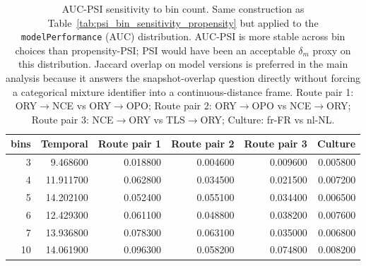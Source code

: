 \begin{table}
\caption{AUC-PSI sensitivity to bin count. Same construction as Table~\ref{tab:psi_bin_sensitivity_propensity} but applied to the \texttt{modelPerformance} (AUC) distribution. AUC-PSI is more stable across bin choices than propensity-PSI; PSI would have been an acceptable $\delta_m$ proxy on this distribution. Jaccard overlap on model versions is preferred in the main analysis because it answers the snapshot-overlap question directly without forcing a categorical mixture identifier into a continuous-distance frame. Route pair 1: ORY$\to$NCE vs ORY$\to$OPO; Route pair 2: ORY$\to$OPO vs NCE$\to$ORY; Route pair 3: NCE$\to$ORY vs TLS$\to$ORY; Culture: fr-FR vs nl-NL.}
\label{tab:psi_bin_sensitivity_auc}
\begin{tabular}{rrrrrr}
\toprule
bins & Temporal & Route pair 1 & Route pair 2 & Route pair 3 & Culture \\
\midrule
3 & 9.468600 & 0.018800 & 0.004600 & 0.009600 & 0.005800 \\
4 & 11.911700 & 0.062800 & 0.034500 & 0.021500 & 0.007200 \\
5 & 14.202100 & 0.052400 & 0.055100 & 0.034400 & 0.006500 \\
6 & 12.429300 & 0.061100 & 0.048800 & 0.038200 & 0.007600 \\
7 & 13.936800 & 0.078300 & 0.063100 & 0.035000 & 0.006800 \\
10 & 14.061900 & 0.096300 & 0.058200 & 0.074800 & 0.008200 \\
\bottomrule
\end{tabular}
\end{table}
